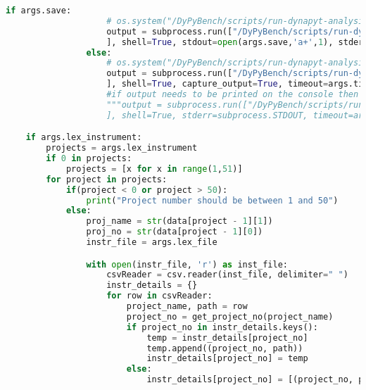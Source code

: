 \begin{lstlisting}[caption=Access Interface of DyPyBench.,label=code:dypybench.py,language=Python]
                if args.save:
                    # os.system("/DyPyBench/scripts/run-dynapyt-analysis.sh %s %s %s %s >> %s 2>&1" %(proj_name, proj_no, analysis, proj_test_folder, args.save))
                    output = subprocess.run(["/DyPyBench/scripts/run-dynapyt-analysis.sh %s %s %s %s %s" %(proj_name, proj_no, analysis, proj_test_folder, args.timeout)
                    ], shell=True, stdout=open(args.save,'a+',1), stderr=subprocess.STDOUT, timeout=args.timeout)
                else:
                    # os.system("/DyPyBench/scripts/run-dynapyt-analysis.sh %s %s %s %s" %(proj_name, proj_no, analysis, proj_test_folder))
                    output = subprocess.run(["/DyPyBench/scripts/run-dynapyt-analysis.sh %s %s %s %s %s" %(proj_name, proj_no, analysis, proj_test_folder, args.timeout)
                    ], shell=True, capture_output=True, timeout=args.timeout)
                    #if output needs to be printed on the console then comment above and uncomment below
                    """output = subprocess.run(["/DyPyBench/scripts/run-dynapyt-analysis.sh %s %s %s %s %s" %(proj_name, proj_no, analysis, proj_test_folder, args.timeout)
                    ], shell=True, stderr=subprocess.STDOUT, timeout=args.timeout)"""

    if args.lex_instrument:
        projects = args.lex_instrument
        if 0 in projects:
            projects = [x for x in range(1,51)]
        for project in projects:
            if(project < 0 or project > 50):
                print("Project number should be between 1 and 50")
            else:
                proj_name = str(data[project - 1][1])
                proj_no = str(data[project - 1][0])
                instr_file = args.lex_file

                with open(instr_file, 'r') as inst_file:
                    csvReader = csv.reader(inst_file, delimiter=" ")
                    instr_details = {}
                    for row in csvReader:
                        project_name, path = row
                        project_no = get_project_no(project_name)
                        if project_no in instr_details.keys():
                            temp = instr_details[project_no]
                            temp.append((project_no, path))
                            instr_details[project_no] = temp
                        else:
                            instr_details[project_no] = [(project_no, path)]


\end{lstlisting}
